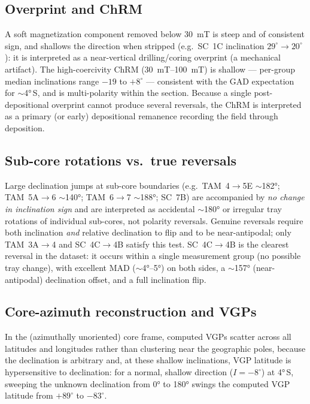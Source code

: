 \documentclass[11pt]{article}
\begin{document}
\subsection{Overprint and ChRM}\label{sec:overprint}
A soft magnetization component removed below \SI{30}{\milli\tesla} is steep and
of consistent sign, and shallows the direction when stripped (e.g.\ SC~1C
inclination $29^\circ\!\to\!20^\circ$): it is interpreted as a near-vertical
drilling/coring overprint (a mechanical artifact). The high-coercivity ChRM
(\SIrange{30}{100}{\milli\tesla}) is shallow --- per-group median inclinations
range $-19$ to $+8^\circ$ --- consistent with the GAD expectation for
$\sim$\ang{4}\,S, and is multi-polarity within the section. Because a single
post-depositional overprint cannot produce several reversals, the ChRM is
interpreted as a primary (or early) depositional remanence recording the field
through deposition.

\subsection{Sub-core rotations vs.\ true reversals}\label{sec:rotations}
Large declination jumps at sub-core boundaries (e.g.\ TAM~4$\to$5E
$\sim$\ang{182}; TAM~5A$\to$6 $\sim$\ang{140}; TAM~6$\to$7 $\sim$\ang{188};
SC~7B) are accompanied by \emph{no change in inclination sign} and are
interpreted as accidental $\sim$\ang{180} or irregular tray rotations of
individual sub-cores, not polarity reversals. Genuine reversals require both
inclination \emph{and} relative declination to flip and to be near-antipodal;
only TAM~3A$\to$4 and SC~4C$\to$4B satisfy this test. SC~4C$\to$4B is the
clearest reversal in the dataset: it occurs within a single measurement group
(no possible tray change), with excellent MAD ($\sim$\ang{4}--\ang{5}) on both
sides, a $\sim$\ang{157} (near-antipodal) declination offset, and a full
inclination flip.

\subsection{Core-azimuth reconstruction and VGPs}\label{sec:vgp}
In the (azimuthally unoriented) core frame, computed VGPs scatter across all
latitudes and longitudes rather than clustering near the geographic poles,
because the declination is arbitrary and, at these shallow inclinations, VGP
latitude is hypersensitive to declination: for a normal, shallow direction
($I=-8^\circ$) at \ang{4}\,S, sweeping the unknown declination from \ang{0} to
\ang{180} swings the computed VGP latitude from $+89^\circ$ to $-83^\circ$.
\end{document}
